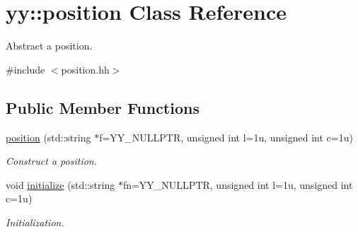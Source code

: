 \hypertarget{classyy_1_1position}{}\section{yy\+:\+:position Class Reference}
\label{classyy_1_1position}


Abstract a position.  




{\ttfamily \#include $<$position.\+hh$>$}

\subsection*{Public Member Functions}
\begin{DoxyCompactItemize}
\item 
\hyperlink{classyy_1_1position_ad3fcd2dd0259a48f24451f7a2dc620c8}{position} (std\+::string $\ast$f=Y\+Y\+\_\+\+N\+U\+L\+L\+P\+TR, unsigned int l=1u, unsigned int c=1u)\hypertarget{classyy_1_1position_ad3fcd2dd0259a48f24451f7a2dc620c8}{}\label{classyy_1_1position_ad3fcd2dd0259a48f24451f7a2dc620c8}

\begin{DoxyCompactList}\small\item\em Construct a position. \end{DoxyCompactList}\item 
void \hyperlink{classyy_1_1position_ab00c8d19ee14c5ed6a2fc344f4b6e6a1}{initialize} (std\+::string $\ast$fn=Y\+Y\+\_\+\+N\+U\+L\+L\+P\+TR, unsigned int l=1u, unsigned int c=1u)\hypertarget{classyy_1_1position_ab00c8d19ee14c5ed6a2fc344f4b6e6a1}{}\label{classyy_1_1position_ab00c8d19ee14c5ed6a2fc344f4b6e6a1}

\begin{DoxyCompactList}\small\item\em Initialization. \end{DoxyCompactList}\end{DoxyCompactItemize}
